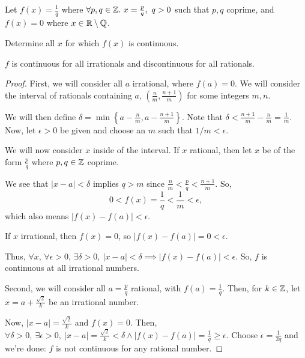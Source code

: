 \documentclass[../hw2]{subfiles}
\begin{document}
\begin{problem}[2]
Let $f(x)=\frac{1}{q}$ where $\forall p,q\in \Z.\ x=\frac{p}{q},\ q>0$ such that $p,q$ coprime, and $f(x)=0$ where $x\in \mathbb{R}\setminus\mathbb{Q}$.

Determine all $x$ for which  $f(x)$ is continuous.
\end{problem}
\begin{proposition}
	$f$ is continuous for all irrationals and discontinuous for all rationals.
\end{proposition}
\begin{proof}
	First, we will consider all $a$ irrational, where $f(a)=0$. We will consider the interval of rationals containing $a$,  $\left( \frac{n}{m}, \frac{n+1}{m} \right) $ for some integers $m,n$.

	We will then define $\delta=\min \left\{ a-\frac{n}{m}, a-\frac{n+1}{m} \right\}$. Note that $\delta<\frac{n+1}{m}-\frac{n}{m}=\frac{1}{m}$. Now, let $\epsilon>0$ be given and choose an $m$ such that $1 / m<\epsilon$.

	We will now consider $x$ inside of the interval. If $x$ rational, then let $x$ be of the form $\frac{p}{q}$ where $p,q\in \mathbb{Z}$ coprime.

	We see that $|x-a|<\delta$ implies $q>m$ since $\frac{n}{m}<\frac{p}{q}<\frac{n+1}{m}$. So, \[
		0<f(x)=\frac{1}{q}<\frac{1}{m}<\epsilon
		,\] which also means $|f(x)-f(a)|<\epsilon$.

	If $x$ irrational, then  $f(x)=0$, so $ |f(x)-f(a)| =0<\epsilon $.

	Thus, $\forall x,\,\forall\epsilon>0,\,\exists\delta>0,\  |x-a| <\delta \implies |f(x)-f(a)| < \epsilon$. So, $f$ is continuous at all irrational numbers.

	Second, we will consider all $a=\frac{p}{q}$ rational, with $f(a)=\frac{1}{q}$.  Then, for $k\in \mathbb{Z}$, let $x=a+\frac{\sqrt{2}}{k}$ be an irrational number.

	Now, $|x-a| = \frac{\sqrt{2}}{k}$ and $f(x)=0$. Then, $\forall \delta>0,\ \exists \epsilon > 0,\ |x-a| =\frac{\sqrt{2} }{k}<\delta \land |f(x)-f(a)| = \frac{1}{q} \ge \epsilon$. Choose $\epsilon=\frac{1}{2q}$ and we're done: $f$ is not continuous for any rational number.
\end{proof}
\end{document}
